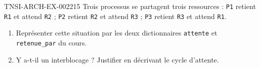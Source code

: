 \begin{exercice}{TNSI-ARCH-EX-002}{2}{15}
Trois processus se partagent trois ressources : \texttt{P1} retient \texttt{R1} et attend \texttt{R2} ; \texttt{P2} retient \texttt{R2} et attend \texttt{R3} ; \texttt{P3} retient \texttt{R3} et attend \texttt{R1}.
\begin{enumerate}
  \item Représenter cette situation par les deux dictionnaires \lstinline{attente} et \lstinline{retenue_par} du cours.
  \item Y a-t-il un interblocage ? Justifier en décrivant le cycle d'attente.
\end{enumerate}
\end{exercice}

